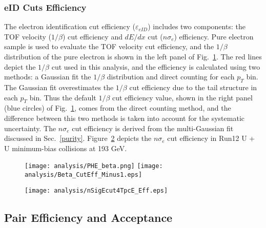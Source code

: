 \subsubsection{eID Cuts Efficiency}
\label{eideff}
The electron identification cut efficiency ($\varepsilon_{eID}$) includes two components: the TOF velocity ($1/\beta$) cut efficiency and $dE/dx$ cut ($n\sigma_{e}$) efficiency. Pure electron sample is used to evaluate the TOF velocity cut efficiency, and the $1/\beta$ distribution of the pure electron is shown in the left panel of Fig.~\ref{betaeff}. The red lines depict the $1/\beta$ cut used in this analysis, and the efficiency is calculated using two methods: a Gaussian fit the $1/\beta$ distribution and direct counting for each $p_{T}$ bin. The Gaussian fit overestimates the $1/\beta$ cut efficiency due to the tail structure in each $p_{T}$ bin. Thus the default $1/\beta$ cut efficiency value, shown in the right panel (blue circles) of Fig.~\ref{betaeff}, comes from the direct counting method, and the difference between this two methods is taken into account for the systematic uncertainty. The $n\sigma_{e}$ cut efficiency is derived from the multi-Gaussian fit discussed in Sec.~\ref{purity}. Figure~\ref{nsigmaeeff} depicts the $n\sigma_{e}$ cut efficiency in Run12 U + U minimum-bias collisions at 193 GeV.

\begin{figure}[htbp]
\centering
\texttt{[image: analysis/PHE\_beta.png]}
\texttt{[image: analysis/Beta\_CutEff\_Minus1.eps]}
\label{betaeff}
\end{figure}

\begin{figure}[htbp]
\centering
\texttt{[image: analysis/nSigEcut4TpcE\_Eff.eps]}
 \label{nsigmaeeff}
\end{figure}

\subsection{Pair Efficiency and Acceptance}
\label{paireff}

